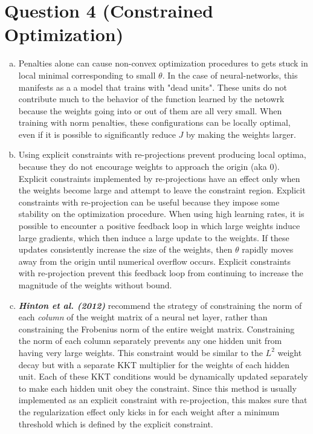 \documentclass[fleqn]{article}
\begin{document}
\section*{Question 4 (Constrained Optimization)}
\begin{enumerate}[a)]
	\item
	Penalties alone can cause non-convex optimization procedures to gets stuck in local minimal corresponding to small $\theta$. In the case of neural-networks, this manifests as a a model that trains with "dead units". These units do not contribute much to the behavior of the function learned by the netowrk because the weights going into or out of them are all very small. When training with norm penalties, these configurations can be locally optimal, even if it is possible to significantly reduce $J$ by making the weights larger.
	\item
	Using explicit constraints with re-projections prevent producing local optima, because they do not encourage weights to approach the origin (aka 0). Explicit constraints implemented by re-projections have an effect only when the weights become large and attempt to leave the constraint region.
	Explicit constraints with re-projection can be useful because they impose some stability on the optimization procedure. When using high learning rates, it is possible to encounter a positive feedback loop in which large weights induce large gradients, which then induce a large update to the weights. If these updates consistently increase the size of the weights, then $\theta$ rapidly moves away from the origin until numerical overflow occurs. Explicit constraints with re-projection prevent this feedback loop from continuing to increase the magnitude of the weights without bound.
	
	\item 
	
	\textit{\textbf{Hinton et al. (2012)}} recommend the strategy of constraining the norm of each \textit{column} of the weight matrix of a neural net layer, rather than constraining the Frobenius norm of the entire weight matrix. Constraining the norm of each column separately prevents any one hidden unit from having very large weights. This constraint would be similar to the $L^2$ weight decay but with a separate KKT multiplier for the weights of each hidden unit. Each of these KKT conditions would be dynamically updated separately to make each hidden unit obey the constraint. Since this method is usually implemented as an explicit constraint with re-projection, this makes sure that the regularization effect only kicks in for each weight after a minimum threshold which is defined by the explicit constraint.
	
\end{enumerate}
\end{document}
